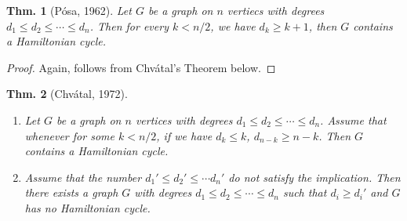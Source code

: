 \documentclass[12pt, a4paper]{book}
\newtheorem{theorem}{Thm.}[section]
\theoremstyle{nonumberplain}
\newtheorem{proof}{Proof}
\begin{document}
\begin{theorem}[P\'osa, 1962]
    Let $G$ be a graph on $n$ vertiecs with degrees $d_1\leq d_2\leq\cdots\leq d_n$.
    Then for every $k<n/2$, we have $d_k\geq k+1$, then $G$ contains a Hamiltonian cycle.
\end{theorem}
\begin{proof}
    Again, follows from Chv\'atal's Theorem below.
\end{proof}
\begin{theorem}[Chv\'atal, 1972]
    \hfill
    \begin{enumerate}[nolistsep, label=(\roman*)]
        \item Let $G$ be a graph on $n$ vertices with degrees $d_1\leq d_2\leq\cdots\leq d_n$.
            Assume that whenever for some $k<n/2$, if we have $d_k\leq k$, $d_{n-k}\geq n-k$.
            Then $G$ contains a Hamiltonian cycle.
        \item Assume that the number $d_1'\leq d_2'\leq\cdots d_n'$ do not satisfy the implication.
            Then there exists a graph $G$ with degrees $d_1\leq d_2\leq\cdots\leq d_n$ such that $d_i\geq d_i'$ and $G$ has no Hamiltonian cycle.
    \end{enumerate}
\end{theorem}
\end{document}
